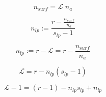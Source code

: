 \documentclass[12pt,letterpaper]{article}
\newcommand{\leng}{\mathcal{L}}
\begin{document}
\begin{equation}
	    n_{surf}= \leng\;n_a
	    \label{eq.nsurf}
\end{equation}

\begin{equation}
	n_{lp}:= \frac{r-\frac{n_{surf}}{n_a}}{s_{lp}-1}
	\label{eq.nlp}
\end{equation}



\begin{equation}
    \bar{n}_{lp}:=r-\leng=r-\frac{n_{surf}}{n_a}
	\label{eq.mean_nlp}
\end{equation}



%
\begin{equation}
\leng
=
r 
- 
n_{lp}
(s_{lp}-1)
\label{eq.lengminus}
\end{equation}


%
\begin{equation}
\leng
-
1
=
(r-1) 
- 
n_{lp}
s_{lp}
+ 
n_{lp}
\label{Eq: leng}
\end{equation}





\end{document}
